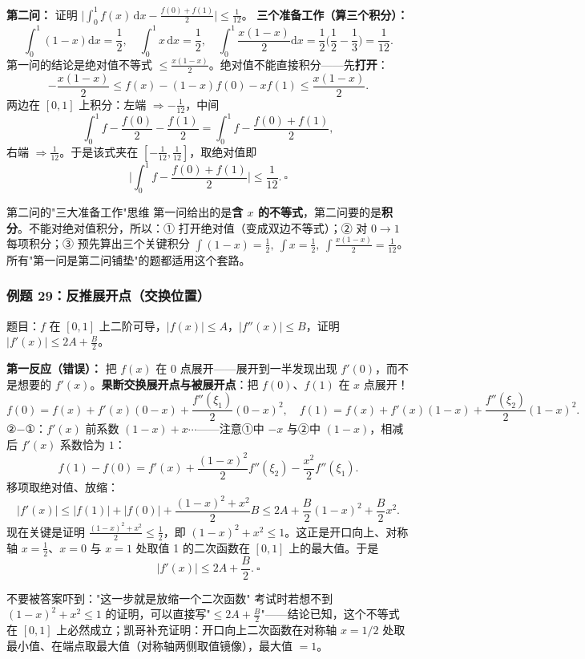 \documentclass[a4paper]{article}
\begin{document}
\textbf{第二问：} 证明 $\Big|\int_0^1 f(x)\,\mathrm{d}x-\frac{f(0)+f(1)}{2}\Big|\le\frac{1}{12}$。
\textbf{三个准备工作（算三个积分）：}
\[
\int_0^1(1-x)\mathrm{d}x=\frac12,\quad \int_0^1 x\,\mathrm{d}x=\frac12,\quad \int_0^1 \frac{x(1-x)}{2}\mathrm{d}x=\frac12\Big(\frac12-\frac13\Big)=\frac1{12}.
\]
第一问的结论是绝对值不等式 $\le\frac{x(1-x)}{2}$。绝对值不能直接积分——先\textbf{打开}：
\[
-\frac{x(1-x)}{2}\le f(x)-(1-x)f(0)-xf(1)\le\frac{x(1-x)}{2}.
\]
两边在 $[0,1]$ 上积分：左端 $\Rightarrow-\frac1{12}$，中间
\[
\int_0^1 f-\frac{f(0)}2-\frac{f(1)}2 =\int_0^1 f-\frac{f(0)+f(1)}2,
\]
右端 $\Rightarrow\frac1{12}$。于是该式夹在 $[-\frac1{12},\frac1{12}]$，取绝对值即
\[
\Big|\int_0^1 f-\frac{f(0)+f(1)}2\Big|\le\frac1{12}.\ \square
\]

\begin{knowledgebox}{第二问的"三大准备工作"思维}
第一问给出的是\textbf{含 $x$ 的不等式}，第二问要的是\textbf{积分}。不能对绝对值积分，所以：① 打开绝对值（变成双边不等式）；② 对 $0\to1$ 每项积分；③ 预先算出三个关键积分 $\int(1-x)=\frac12,\ \int x=\frac12,\ \int\frac{x(1-x)}2=\frac1{12}$。所有"第一问是第二问铺垫"的题都适用这个套路。
\end{knowledgebox}

\subsubsection{例题 29：反推展开点（交换位置）}

题目：$f$ 在 $[0,1]$ 上二阶可导，$|f(x)|\le A$，$|f''(x)|\le B$，证明 $|f'(x)|\le 2A+\frac{B}{2}$。

\textbf{第一反应（错误）：} 把 $f(x)$ 在 0 点展开——展开到一半发现出现 $f'(0)$，而不是想要的 $f'(x)$。\textbf{果断交换展开点与被展开点}：把 $f(0)$、$f(1)$ 在 $x$ 点展开！
\[
f(0)=f(x)+f'(x)(0-x)+\frac{f''(\xi_1)}2(0-x)^2,\quad
f(1)=f(x)+f'(x)(1-x)+\frac{f''(\xi_2)}2(1-x)^2 .
\]
②$-$①：$f'(x)$ 前系数 $(1-x)+x\cdots$——注意①中 $-x$ 与②中 $(1-x)$，相减后 $f'(x)$ 系数恰为 $1$：
\[
f(1)-f(0)=f'(x)+\frac{(1-x)^2}{2}f''(\xi_2)-\frac{x^2}{2}f''(\xi_1).
\]
移项取绝对值、放缩：
\[
|f'(x)|\le |f(1)|+|f(0)|+\frac{(1-x)^2+x^2}{2}B\le 2A+\frac{B}{2}(1-x)^2+\frac{B}{2}x^2 .
\]
现在关键是证明 $\frac{(1-x)^2+x^2}{2}\le\frac12$，即 $(1-x)^2+x^2\le 1$。这正是开口向上、对称轴 $x=\frac12$、$x=0$ 与 $x=1$ 处取值 1 的二次函数在 $[0,1]$ 上的最大值。于是
\[
|f'(x)|\le2A+\frac{B}{2}.\ \square
\]
\begin{warningbox}{不要被答案吓到："这一步就是放缩一个二次函数"}
考试时若想不到 $(1-x)^2+x^2\le1$ 的证明，可以直接写"$\le2A+\frac B2$"——结论已知，这个不等式在 $[0,1]$ 上必然成立；凯哥补充证明：开口向上二次函数在对称轴 $x=1/2$ 处取最小值、在端点取最大值（对称轴两侧取值镜像），最大值 $=1$。
\end{warningbox}
\end{document}
